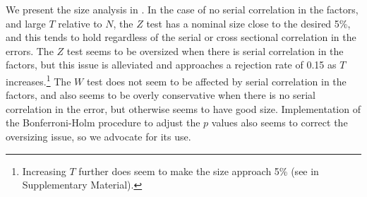 \documentclass[12pt]{article}
\theoremstyle{plain}
\numberwithin{equation}{section}
\begin{document}
We present the size analysis in . In the case of no serial correlation in the factors, and large $T$ relative to $N$, the $Z$ test has a nominal size close to the desired 5\%, and this tends to hold regardless of the serial or cross sectional correlation in the errors. The $Z$ test seems to be oversized when there is serial correlation in the factors, but this issue is alleviated and approaches a rejection rate of 0.15 as $T$ increases.\footnote{Increasing $T$ further does seem to make the size approach 5\% (see  in Supplementary Material).} The $W$ test does not seem to be affected by serial correlation in the factors, and also seems to be overly conservative when there is no serial correlation in the error, but otherwise seems to have good size. Implementation of the Bonferroni-Holm procedure to adjust the $p$ values also seems to correct the oversizing issue, so we advocate for its use. 
%
\end{document}
